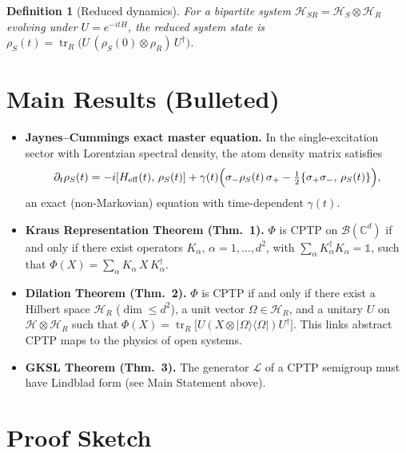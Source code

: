 \documentclass[11pt,a4paper]{article}
\newtheorem{definition}{Definition}
\begin{document}
\begin{definition}[Reduced dynamics]
For a bipartite system $\mathcal{H}_{SR} = \mathcal{H}_S \otimes \mathcal{H}_R$ evolving under $U = e^{-itH}$, the \emph{reduced system state} is
$\rho_S(t) = \operatorname{tr}_R\bigl(U\,(\rho_S(0)\otimes\rho_R)\,U^\dagger\bigr)$.
\end{definition}

\section{Main Results (Bulleted)}

\begin{itemize}[leftmargin=*]
  \item \textbf{Jaynes--Cummings exact master equation.}  In the single-excitation sector with Lorentzian spectral density, the atom density matrix satisfies
  \[
    \partial_t \rho_S(t) = -i[H_{\mathrm{eff}}(t),\,\rho_S(t)]
      + \gamma(t)\Bigl(\sigma_- \rho_S(t)\,\sigma_+
        - \tfrac12\{\sigma_+\sigma_-,\,\rho_S(t)\}\Bigr),
  \]
  an exact (non-Markovian) equation with time-dependent $\gamma(t)$.

  \item \textbf{Kraus Representation Theorem (Thm.~1).}  $\Phi$ is CPTP on $\mathcal{B}(\mathbb{C}^d)$ if and only if there exist operators $K_\alpha$, $\alpha = 1,\dots,d^2$, with $\sum_\alpha K_\alpha^\dagger K_\alpha = \mathbb{1}$, such that
  $\Phi(X) = \sum_\alpha K_\alpha\, X\, K_\alpha^\dagger$.

  \item \textbf{Dilation Theorem (Thm.~2).}  $\Phi$ is CPTP if and only if there exist a Hilbert space $\mathcal{H}_R$ ($\dim \le d^2$), a unit vector $\Omega \in \mathcal{H}_R$, and a unitary $U$ on $\mathcal{H}\otimes\mathcal{H}_R$ such that
  $\Phi(X) = \operatorname{tr}_R\bigl[U(X\otimes|\Omega\rangle\langle\Omega|)U^\dagger\bigr]$.
  This links abstract CPTP maps to the physics of open systems.

  \item \textbf{GKSL Theorem (Thm.~3).}  The generator $\mathcal{L}$ of a CPTP semigroup must have Lindblad form (see Main Statement above).
\end{itemize}

\section{Proof Sketch}
\end{document}
